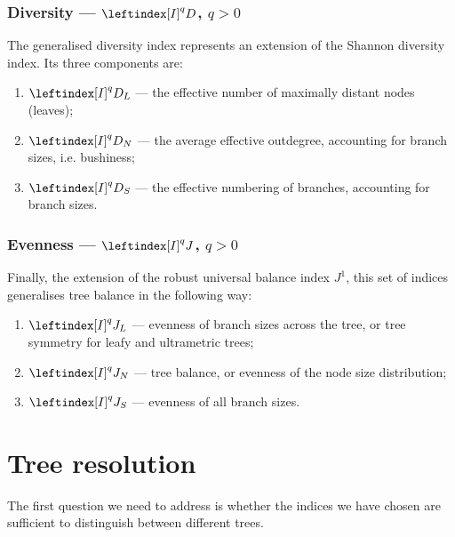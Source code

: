 \subsubsection{Diversity --- $\leftindex[I]^q{D}$, $q>0$}
The generalised diversity index represents an extension of the Shannon diversity index. Its three components are:
\begin{enumerate}
    \item $\leftindex[I]^q{D}_L$ --- the effective number of maximally distant nodes (leaves);
    \item $\leftindex[I]^q{D}_N$ --- the average effective outdegree, accounting for branch sizes, i.e. bushiness;
    \item $\leftindex[I]^q{D}_S$ --- the effective numbering of branches, accounting for branch sizes.
\end{enumerate}
\subsubsection{Evenness --- $\leftindex[I]^q{J}$, $q>0$}
Finally, the extension of the robust universal balance index $J^1$, this set of indices generalises tree balance in the following way:
\begin{enumerate}
    \item $\leftindex[I]^q{J}_L$ --- evenness of branch sizes across the tree, or tree symmetry for leafy and ultrametric trees;
    \item $\leftindex[I]^q{J}_N$ --- tree balance, or evenness of the node size distribution;
    \item $\leftindex[I]^q{J}_S$ --- evenness of all branch sizes.
\end{enumerate}

\section{Tree resolution}
The first question we need to address is whether the indices we have chosen are sufficient to distinguish between different trees.
